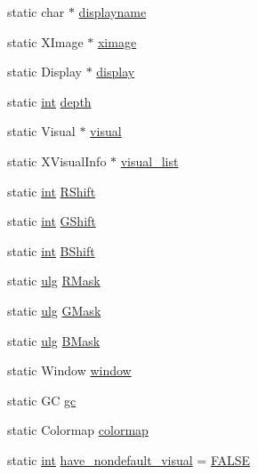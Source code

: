 \begin{DoxyCompactItemize}
static char $\ast$ \mbox{\hyperlink{rpng2-x_8c_a50689dac041ace6e96378e3f30ca5cc4}{displayname}}
\item 
static X\+Image $\ast$ \mbox{\hyperlink{rpng2-x_8c_a49ce7b9b4d558b607f8ad1854599fde2}{ximage}}
\item 
static Display $\ast$ \mbox{\hyperlink{rpng2-x_8c_a854f9eb314f72feecf68ba03c6f0e5d5}{display}}
\item 
static \mbox{\hyperlink{ioapi_8h_a787fa3cf048117ba7123753c1e74fcd6}{int}} \mbox{\hyperlink{rpng2-x_8c_acb5ba97551079e0b072c62c21d784ac5}{depth}}
\item 
static Visual $\ast$ \mbox{\hyperlink{rpng2-x_8c_a6ff21403d498574a0185ea2e360e66e9}{visual}}
\item 
static X\+Visual\+Info $\ast$ \mbox{\hyperlink{rpng2-x_8c_a60185eb73e2607b97ece59bd1ef958a1}{visual\+\_\+list}}
\item 
static \mbox{\hyperlink{ioapi_8h_a787fa3cf048117ba7123753c1e74fcd6}{int}} \mbox{\hyperlink{rpng2-x_8c_a749e9e93860b1af042087034eea7684c}{R\+Shift}}
\item 
static \mbox{\hyperlink{ioapi_8h_a787fa3cf048117ba7123753c1e74fcd6}{int}} \mbox{\hyperlink{rpng2-x_8c_aab8970c588e523b349cc24466aacfdb7}{G\+Shift}}
\item 
static \mbox{\hyperlink{ioapi_8h_a787fa3cf048117ba7123753c1e74fcd6}{int}} \mbox{\hyperlink{rpng2-x_8c_a4ebd97c21166f35b46ac4d4409ee3edf}{B\+Shift}}
\item 
static \mbox{\hyperlink{readpng_8h_abd6f60bf9450af2ecb94097a32c19a64}{ulg}} \mbox{\hyperlink{rpng2-x_8c_a212e4ea41130e09c64e370b2bb342724}{R\+Mask}}
\item 
static \mbox{\hyperlink{readpng_8h_abd6f60bf9450af2ecb94097a32c19a64}{ulg}} \mbox{\hyperlink{rpng2-x_8c_a2fbd729689ff182bd914481196f3850e}{G\+Mask}}
\item 
static \mbox{\hyperlink{readpng_8h_abd6f60bf9450af2ecb94097a32c19a64}{ulg}} \mbox{\hyperlink{rpng2-x_8c_ad1a7f16abbb81ff4ed49b6eb472e9822}{B\+Mask}}
\item 
static Window \mbox{\hyperlink{rpng2-x_8c_ac5b0b3c19d476a314bb68af9bc4a0ee0}{window}}
\item 
static GC \mbox{\hyperlink{rpng2-x_8c_a5da9d24666f1955a9b5ce3d2583b823a}{gc}}
\item 
static Colormap \mbox{\hyperlink{rpng2-x_8c_af611adb2a277a44b745300318b0bbca7}{colormap}}
\item 
static \mbox{\hyperlink{ioapi_8h_a787fa3cf048117ba7123753c1e74fcd6}{int}} \mbox{\hyperlink{rpng2-x_8c_a93e94a7490818556d4d9d76a804cc24f}{have\+\_\+nondefault\+\_\+visual}} = \mbox{\hyperlink{pnm2png_8c_aa93f0eb578d23995850d61f7d61c55c1}{F\+A\+L\+SE}}

\end{DoxyCompactItemize}
